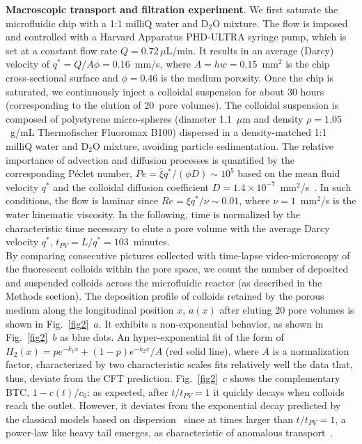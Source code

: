\documentclass[singlecolumn,pre,notitlepage,preprintnumbers,floatfix,superscriptaddress]{revtex4-1}
\begin{document}
\noindent
\textbf{Macroscopic transport and filtration experiment}. 
We first saturate the microfluidic chip with a 1:1 milliQ water and D$_2$O mixture. The flow is imposed and controlled with a Harvard Apparatus PHD-ULTRA syringe pump, which is set at a constant flow rate $Q = 0.72 \, \mu$L/min. It results in an average (Darcy) velocity of $q^{\ast} = Q/A \phi = 0.16$~mm/s, where $A = h w = 0.15$~mm$^2$ is the chip cross-sectional surface and $\phi = 0.46$ is the medium porosity. Once the chip is saturated, we continuously inject a colloidal suspension for about 30 hours (corresponding to the elution of 20~pore volumes). The colloidal suspension is composed of polystyrene micro-spheres (diameter 1.1~$\mu$m and density $\rho = 1.05$~g/mL Thermofischer Fluoromax B100) dispersed in a density-matched 1:1 milliQ water and D$_2$O mixture, avoiding particle sedimentation. The relative importance of advection and diffusion processes is quantified by the corresponding Péclet number, $Pe = \overline{\xi} q^{\ast} / (\phi D) \sim 10^5$ based on the mean fluid velocity $q^{\ast}$ and the colloidal diffusion coefficient $D = 1.4 × 10^{-7}$~mm$^2$/s~\cite{bordoloi_structure_2022}. In such conditions, the flow is laminar since $Re = \xi q^{\ast} / \nu \sim 0.01$, where $\nu = 1$~mm$^2$/s is the water kinematic viscosity. In the following, time is normalized by the characteristic time necessary to elute a pore volume with the average Darcy velocity $q^{\ast}$, $t_{PV} = L/q^{\ast} = 103$~minutes.\\
\noindent
By comparing consecutive pictures collected with time-lapse video-microscopy of the fluorescent colloids within the pore space, we count the number of deposited and suspended colloids across the microfluidic reactor (as described in the Methods section). The deposition profile of colloids retained by the porous medium along the longitudinal position $x$, $a(x)$ after eluting 20 pore volumes is shown in Fig.~\ref{fig2}~$a$. It exhibits a non-exponential behavior, as shown in Fig.~\ref{fig2}~$b$ as blue dots. An hyper-exponential fit of the form of $H_2(x) = pe^{-k_1x} + (1-p)e^{-k_2x}/A$ (red solid line), where $A$ is a normalization factor, characterized by two characteristic scales fits relatively well the data that, thus, deviate from the CFT prediction. Fig.~\ref{fig2}~$c$ shows the complementary BTC, $1-c(t)/c_0$: as expected, after $t/t_{PV} = 1$ it quickly decays when colloids reach the outlet. However, it deviates from the exponential decay predicted by the classical models based on dispersion~\cite{Dentz2011} since at times larger than $t/t_{PV}= 1$, a power-law like heavy tail emerges, as characteristic of anomalous transport~\cite{Berkowitz2006}. \\
\end{document}
